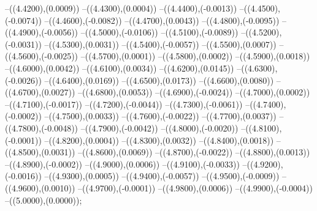 {	--({\sx*(4.4200)},{\sy*(0.0009)})
	--({\sx*(4.4300)},{\sy*(0.0004)})
	--({\sx*(4.4400)},{\sy*(-0.0013)})
	--({\sx*(4.4500)},{\sy*(-0.0074)})
	--({\sx*(4.4600)},{\sy*(-0.0082)})
	--({\sx*(4.4700)},{\sy*(0.0043)})
	--({\sx*(4.4800)},{\sy*(-0.0095)})
	--({\sx*(4.4900)},{\sy*(-0.0056)})
	--({\sx*(4.5000)},{\sy*(-0.0106)})
	--({\sx*(4.5100)},{\sy*(-0.0089)})
	--({\sx*(4.5200)},{\sy*(-0.0031)})
	--({\sx*(4.5300)},{\sy*(0.0031)})
	--({\sx*(4.5400)},{\sy*(-0.0057)})
	--({\sx*(4.5500)},{\sy*(0.0007)})
	--({\sx*(4.5600)},{\sy*(-0.0025)})
	--({\sx*(4.5700)},{\sy*(0.0001)})
	--({\sx*(4.5800)},{\sy*(0.0002)})
	--({\sx*(4.5900)},{\sy*(0.0018)})
	--({\sx*(4.6000)},{\sy*(0.0042)})
	--({\sx*(4.6100)},{\sy*(0.0034)})
	--({\sx*(4.6200)},{\sy*(0.0145)})
	--({\sx*(4.6300)},{\sy*(-0.0026)})
	--({\sx*(4.6400)},{\sy*(0.0169)})
	--({\sx*(4.6500)},{\sy*(0.0173)})
	--({\sx*(4.6600)},{\sy*(0.0080)})
	--({\sx*(4.6700)},{\sy*(0.0027)})
	--({\sx*(4.6800)},{\sy*(0.0053)})
	--({\sx*(4.6900)},{\sy*(-0.0024)})
	--({\sx*(4.7000)},{\sy*(0.0002)})
	--({\sx*(4.7100)},{\sy*(-0.0017)})
	--({\sx*(4.7200)},{\sy*(-0.0044)})
	--({\sx*(4.7300)},{\sy*(-0.0061)})
	--({\sx*(4.7400)},{\sy*(-0.0002)})
	--({\sx*(4.7500)},{\sy*(0.0033)})
	--({\sx*(4.7600)},{\sy*(-0.0022)})
	--({\sx*(4.7700)},{\sy*(0.0037)})
	--({\sx*(4.7800)},{\sy*(-0.0048)})
	--({\sx*(4.7900)},{\sy*(-0.0042)})
	--({\sx*(4.8000)},{\sy*(-0.0020)})
	--({\sx*(4.8100)},{\sy*(-0.0001)})
	--({\sx*(4.8200)},{\sy*(0.0004)})
	--({\sx*(4.8300)},{\sy*(0.0032)})
	--({\sx*(4.8400)},{\sy*(0.0018)})
	--({\sx*(4.8500)},{\sy*(0.0031)})
	--({\sx*(4.8600)},{\sy*(0.0069)})
	--({\sx*(4.8700)},{\sy*(-0.0022)})
	--({\sx*(4.8800)},{\sy*(0.0013)})
	--({\sx*(4.8900)},{\sy*(-0.0002)})
	--({\sx*(4.9000)},{\sy*(0.0006)})
	--({\sx*(4.9100)},{\sy*(-0.0033)})
	--({\sx*(4.9200)},{\sy*(-0.0016)})
	--({\sx*(4.9300)},{\sy*(0.0005)})
	--({\sx*(4.9400)},{\sy*(-0.0057)})
	--({\sx*(4.9500)},{\sy*(-0.0009)})
	--({\sx*(4.9600)},{\sy*(0.0010)})
	--({\sx*(4.9700)},{\sy*(-0.0001)})
	--({\sx*(4.9800)},{\sy*(0.0006)})
	--({\sx*(4.9900)},{\sy*(-0.0004)})
	--({\sx*(5.0000)},{\sy*(0.0000)});
}
